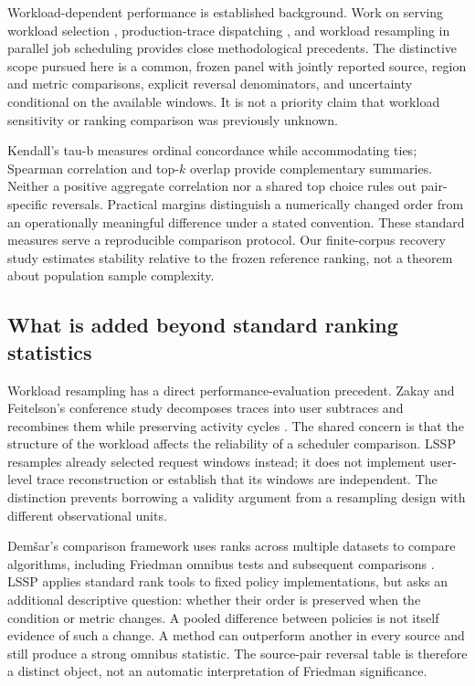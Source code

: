 \label{sec:related-dependence}
Workload-dependent performance is established background. Work on serving
workload selection \citep{papaioannou2024workload}, production-trace
dispatching \citep{yildiz2026dispatching}, and workload resampling in parallel
job scheduling \citep{zakay2014resampling} provides close methodological
precedents. The distinctive scope pursued here is a common, frozen panel
with jointly reported source, region and metric comparisons, explicit
reversal denominators, and uncertainty conditional on the available windows.
It is not a priority claim that workload sensitivity or ranking comparison
was previously unknown.

\label{sec:related-methodology}\label{sec:related-position}
Kendall's tau-b measures ordinal concordance while accommodating ties;
Spearman correlation and top-$k$ overlap provide complementary summaries.
Neither a positive aggregate correlation nor a shared top choice rules out
pair-specific reversals. Practical margins distinguish a numerically changed
order from an operationally meaningful difference under a stated convention.
These standard measures serve a reproducible comparison protocol. Our
finite-corpus recovery study estimates stability relative to the frozen
reference ranking, not a theorem about population sample complexity.

\subsection{What is added beyond standard ranking statistics}
Workload resampling has a direct performance-evaluation precedent.
Zakay and Feitelson's conference study decomposes traces into user
subtraces and recombines them while preserving activity cycles
\citep{zakay2013resampling}. The shared concern is that the structure of
the workload affects the reliability of a scheduler comparison. LSSP
resamples already selected request windows instead; it does not implement
user-level trace reconstruction or establish that its windows are
independent. The distinction prevents borrowing a validity argument from
a resampling design with different observational units.

Dem\v{s}ar's comparison framework uses ranks across multiple datasets to
compare algorithms, including Friedman omnibus tests and subsequent
comparisons \citep{demsar2006comparisons}. LSSP applies standard rank tools
to fixed policy implementations, but asks an additional descriptive
question: whether their order is preserved when the condition or metric
changes. A pooled difference between policies is not itself evidence of
such a change. A method can outperform another in every source and still
produce a strong omnibus statistic. The source-pair reversal table is
therefore a distinct object, not an automatic interpretation of Friedman
significance.

